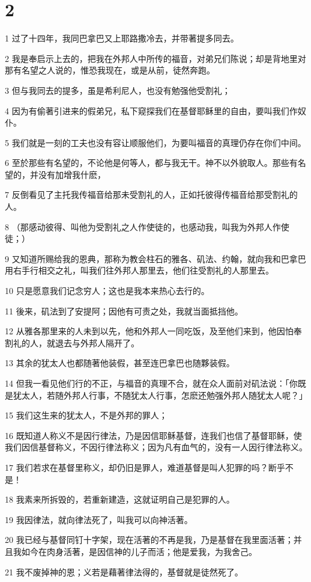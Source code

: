 \chapter{2}

\par 1 过了十四年，我同巴拿巴又上耶路撒冷去，并带著提多同去。
\par 2 我是奉启示上去的，把我在外邦人中所传的福音，对弟兄们陈说；却是背地里对那有名望之人说的，惟恐我现在，或是从前，徒然奔跑。
\par 3 但与我同去的提多，虽是希利尼人，也没有勉强他受割礼；
\par 4 因为有偷著引进来的假弟兄，私下窥探我们在基督耶稣里的自由，要叫我们作奴仆。
\par 5 我们就是一刻的工夫也没有容让顺服他们，为要叫福音的真理仍存在你们中间。
\par 6 至於那些有名望的，不论他是何等人，都与我无干。神不以外貌取人。那些有名望的，并没有加增我什麽，
\par 7 反倒看见了主托我传福音给那未受割礼的人，正如托彼得传福音给那受割礼的人。
\par 8 （那感动彼得、叫他为受割礼之人作使徒的，也感动我，叫我为外邦人作使徒；）
\par 9 又知道所赐给我的恩典，那称为教会柱石的雅各、矶法、约翰，就向我和巴拿巴用右手行相交之礼，叫我们往外邦人那里去，他们往受割礼的人那里去。
\par 10 只是愿意我们记念穷人；这也是我本来热心去行的。
\par 11 後来，矶法到了安提阿；因他有可责之处，我就当面抵挡他。
\par 12 从雅各那里来的人未到以先，他和外邦人一同吃饭，及至他们来到，他因怕奉割礼的人，就退去与外邦人隔开了。
\par 13 其余的犹太人也都随著他装假，甚至连巴拿巴也随夥装假。
\par 14 但我一看见他们行的不正，与福音的真理不合，就在众人面前对矶法说：「你既是犹太人，若随外邦人行事，不随犹太人行事，怎麽还勉强外邦人随犹太人呢？」
\par 15 我们这生来的犹太人，不是外邦的罪人；
\par 16 既知道人称义不是因行律法，乃是因信耶稣基督，连我们也信了基督耶稣，使我们因信基督称义，不因行律法称义；因为凡有血气的，没有一人因行律法称义。
\par 17 我们若求在基督里称义，却仍旧是罪人，难道基督是叫人犯罪的吗？断乎不是！
\par 18 我素来所拆毁的，若重新建造，这就证明自己是犯罪的人。
\par 19 我因律法，就向律法死了，叫我可以向神活著。
\par 20 我已经与基督同钉十字架，现在活著的不再是我，乃是基督在我里面活著；并且我如今在肉身活著，是因信神的儿子而活；他是爱我，为我舍己。
\par 21 我不废掉神的恩；义若是藉著律法得的，基督就是徒然死了。

